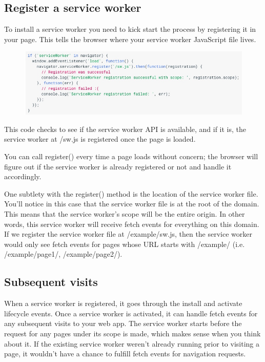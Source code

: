 \documentclass[14pt,a4paper,final]{extreport}
\begin{document}
\subsection{Register a service worker}
\item To install a service worker you need to kick start the process by registering it in your page. This tells the browser where your service worker JavaScript file lives.
\begin{figure}[h]
		\includegraphics[scale=.6]{s1.jpeg}
	
    
\end{figure}
\item This code checks to see if the service worker API is available, and if it is, the service worker at /sw.js is registered once the page is loaded.

You can call register() every time a page loads without concern; the browser will figure out if the service worker is already registered or not and handle it accordingly.

One subtlety with the register() method is the location of the service worker file. You'll notice in this case that the service worker file is at the root of the domain. This means that the service worker's scope will be the entire origin. In other words, this service worker will receive fetch events for everything on this domain. If we register the service worker file at /example/sw.js, then the service worker would only see fetch events for pages whose URL starts with /example/ (i.e. /example/page1/, /example/page2/).
\subsection{Subsequent visits}
\item When a service worker is registered, it goes through the install and activate lifecycle events. Once a service worker is activated, it can handle fetch events for any subsequent visits to your web app. The service worker starts before the request for any pages under its scope is made, which makes sense when you think about it. If the existing service worker weren't already running prior to visiting a page, it wouldn't have a chance to fulfill fetch events for navigation requests.
\end{document}
